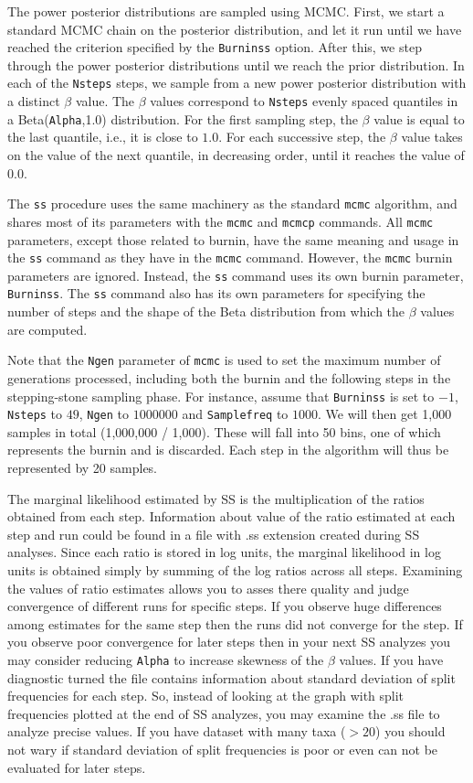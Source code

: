 \documentclass[12pt]{book}
\newcommand{\ttt}[1]{\texttt{#1}}
\begin{document}
The power posterior distributions are sampled using MCMC. First, we start a standard MCMC chain on
the posterior distribution, and let it run until we have reached the criterion specified by the
\ttt{Burninss} option. After this, we step through the power posterior distributions until we reach
the prior distribution. In each of the \ttt{Nsteps} steps, we sample from a new power posterior
distribution with a distinct $\beta$ value. The $\beta$ values correspond to \ttt{Nsteps} evenly
spaced quantiles in a Beta(\ttt{Alpha},1.0) distribution. For the first sampling step, the $\beta$
value is equal to the last quantile, i.e., it is close to $1.0$. For each successive step, the
$\beta$ value takes on the value of the next quantile, in decreasing order, until it reaches the
value of $0.0$.


The \ttt{ss} procedure uses the same machinery as the standard \ttt{mcmc} algorithm, and shares
most of its parameters with the \ttt{mcmc} and \ttt{mcmcp} commands. All \ttt{mcmc} parameters,
except those related to burnin, have the same meaning and usage in the \ttt{ss} command as they
have in the \ttt{mcmc} command. However, the \ttt{mcmc} burnin parameters are ignored. Instead, the
\ttt{ss} command uses its own burnin parameter, \ttt{Burninss}. The \ttt{ss} command also has its
own parameters for specifying the number of steps and the shape of the Beta distribution from which
the $\beta$ values are computed.

Note that the \ttt{Ngen} parameter of \ttt{mcmc} is used to set the maximum number of generations
processed, including both the burnin and the following steps in the stepping-stone sampling phase.
For instance, assume that \ttt{Burninss} is set to $-1$, \ttt{Nsteps} to $49$, \ttt{Ngen} to
$1000000$ and \ttt{Samplefreq} to $1000$. We will then get 1,000 samples in total (1,000,000 /
1,000). These will fall into 50 bins, one of which represents the burnin and is discarded. Each
step in the algorithm will thus be represented by 20 samples.


The marginal likelihood estimated by SS is the multiplication of the ratios obtained from each
step. Information about value of the ratio estimated at each step and run could be found in a file
with .ss extension created during SS analyses. Since each ratio is stored in log units, the
marginal likelihood in log units is obtained simply by summing of the log ratios across all steps.
Examining the values of ratio estimates allows you to asses there quality and judge convergence of
different runs for specific steps. If you observe huge differences among estimates for the same
step then the runs did not converge for the step. If you observe poor convergence for later steps
then in your next SS analyzes you may consider reducing \ttt{Alpha} to increase skewness of the
$\beta$ values. If you have diagnostic turned the file contains information about standard
deviation of split frequencies for each step. So, instead of looking at the graph with split
frequencies plotted at the end of SS analyzes, you may examine the .ss file to analyze precise
values. If you have dataset with many taxa ($>20$) you should not wary if standard deviation of
split frequencies is poor or even can not be evaluated for later steps.
\end{document}
